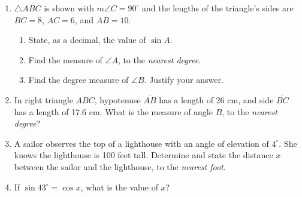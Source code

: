 \documentclass[12pt, twoside]{article}
\begin{document}
\begin{enumerate}
   \item $\triangle ABC$ is shown with $m\angle C=90^\circ$ and the lengths of the triangle's sides are $BC=8$, $AC=6$, and $AB=10$.
   \begin{multicols}{2}
         \begin{enumerate}
         \item State, as a decimal, the value of $\sin A$. \vspace{0.75cm}
         \item Find the measure of $\angle A$, to the \emph{nearest degree}. \vspace{0.75cm}
         \item Find the degree measure of $\angle B$. Justify your answer.
       \end{enumerate}
     \end{multicols}
     \vspace{1.25cm}

    \item In right triangle $ABC$, hypotenuse $\overline{AB}$ has a length of 26 cm, and side $\overline{BC}$ has a length of 17.6 cm. What is the measure of angle $B$, to the \emph{nearest degree}? \vspace{3.25cm}

    \item A sailor observes the top of a lighthouse with an angle of elevation of $4^\circ$. She knows the lighthouse is 100 feet tall. Determine and state the distance $x$ between the sailor and the lighthouse, to the \emph{nearest foot}.\\[0.25cm]
     \vspace{3.25cm}

    \item If $\sin 43^\circ = \cos x$, what is the value of $x$?

  \end{enumerate}
  \newpage
  \setcounter{page}{1}
\end{document}

